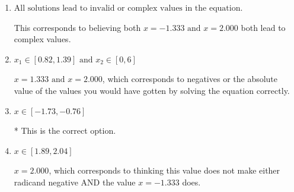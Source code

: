 \documentclass{extbook}[14pt]
\begin{document}
\begin{enumerate}
{\begin{enumerate}[label=\Alph*.]
$x = -1.333 \text{ and } x = 2.000$, which corresponds to not checking that $x = 2.000$ leads to a negative in at least one of the radicands.
\item \( \text{All solutions lead to invalid or complex values in the equation.} \)

This corresponds to believing both $x = -1.333 \text{ and } x = 2.000$ both lead to complex values.
\item \( x_1 \in [0.82, 1.39] \text{ and } x_2 \in [0,6] \)

$x = 1.333 \text{ and } x = 2.000$, which corresponds to negatives or the absolute value of the values you would have gotten by solving the equation correctly.
\item \( x \in [-1.73,-0.76] \)

* This is the correct option.
\item \( x \in [1.89,2.04] \)

$x = 2.000$, which corresponds to thinking this value does not make either radicand negative AND the value $x = -1.333$ does.
\end{enumerate}

}
\end{enumerate}
\end{document}
